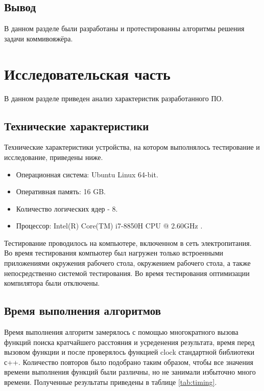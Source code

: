 \documentclass[12pt]{report}
\begin{document}
\section*{Вывод}
	
В данном разделе были разработаны и протестированны алгоритмы решения задачи коммивояжёра.
	
\chapter{Исследовательская часть}
	
В данном разделе приведен анализ характеристик разработанного ПО.

\section{Технические характеристики}
	
Технические характеристики устройства, на котором выполнялось тестирование и исследование, приведены ниже.

\begin{itemize}
	\item Операционная система: Ubuntu Linux 64-bit.
	\item Оперативная память: 16 GB.
	\item Количество логических ядер - 8.
	\item Процессор: Intel(R) Core(TM) i7-8850H CPU @ 2.60GHz \cite{intel}.
\end{itemize}

Тестирование проводилось на компьютере, включенном в сеть электропитания. Во время тестирования компьютер был нагружен только встроенными приложениями окружения рабочего стола, окружением рабочего стола, а также непосредственно системой тестирования. Во время тестирования оптимизации компилятора были отключены.
	
\section{Время выполнения алгоритмов}
	
Время выполнения алгоритм замерялось с помощью многократного вызова функций поиска кратчайшего расстояния и усреденения результата, время перед вызовом функции и после проверялось функцией clock \cite{clock} стандартной библиотеки с++. Количество повторов было подобрано таким образом, чтобы все значения времени выполнения функций были различны, но не занимали избыточно много времени.  Полученные результаты приведены в таблице \ref{tab:timing}.
\end{document}
